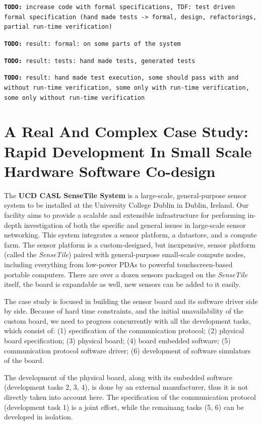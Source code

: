\documentclass{article} \usepackage{times}
\newcommand{\todo}[1]{\texttt{\textbf{TODO:} #1}}
\newcommand{\ST}{\emph{SenseTile}\xspace}
\begin{document}
\todo{increase code with formal specifications, TDF: test driven formal specification (hand made tests -> formal, design, refactorings, partial run-time verification)}

\todo{result: formal: on some parts of the system}

\todo{result: tests: hand made tests, generated tests}

\todo{result: hand made test execution, some should pass with and without run-time verification, some only with run-time verification, some only without run-time verification}



\section{A Real And Complex Case Study: Rapid Development In Small Scale Hardware Software Co-design}
\label{sec:a_real_and_complex_case_study}

The \textbf{UCD CASL SenseTile System} is a large-scale, general-purpose sensor system to be installed at the University College Dublin in Dublin, Ireland.  
Our facility aims to provide a scalable and extensible infrastructure for performing in-depth investigation of both the specific and general issues in large-scale sensor networking.
This system integrates a sensor platform, a datastore, and a compute farm.  
The sensor platform is a custom-designed, but inexpensive, sensor platform (called the \ST) paired with general-purpose small-scale compute nodes, including everything from low-power PDAs to powerful touchscreen-based portable computers.  
There are over a dozen sensors packaged on the \ST itself, the board is expandable as well, new sensors can be added to it easily.

The case study is focused in building the sensor board and its software driver side by side.
Because of hard time constraints, and the initial unavailability of the custom board, we need to progress concurrently with all the development tasks, which consist of: (1) specification of the communication protocol; (2) physical board specification; (3) physical board; (4) board embedded software; (5) communication protocol software driver; (6) development of software simulators of the board.

The development of the physical board, along with its embedded software (development tasks 2, 3, 4), is done by an external manufacturer, thus it is not directly taken into account here. The specification of the communication protocol (development task 1) is a joint effort, while the remainang tasks (5, 6) can be developed in isolation.
\end{document}
